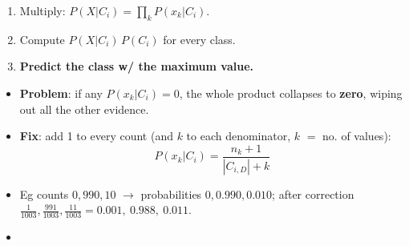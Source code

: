 {\begin{enumerate}
\begin{itemize}
  \end{itemize}
  \item Multiply: $P(X|C_i) = \prod_k P(x_k|C_i)$.
  \item Compute $P(X|C_i)\,P(C_i)$ for every class.
  \item \textbf{Predict the class w/ the maximum value.}
\end{enumerate}
\begin{itemize}
  \item \textbf{Problem}: if any $P(x_k|C_i)=0$, the whole product collapses to \textbf{zero},
        wiping out all the other evidence.
  \item \textbf{Fix}: add 1 to every count (and $k$ to each denominator, $k$ $=$ no. of values):
        \[ P(x_k|C_i) = \frac{n_{k}+1}{|C_{i,D}|+k} \]
  \item Eg counts $0, 990, 10$ $\rightarrow$ probabilities $0, 0.990, 0.010$;
        after correction $\frac{1}{1003}, \frac{991}{1003}, \frac{11}{1003}
        = 0.001,\ 0.988,\ 0.011$.
  \item {}
\end{itemize}}

